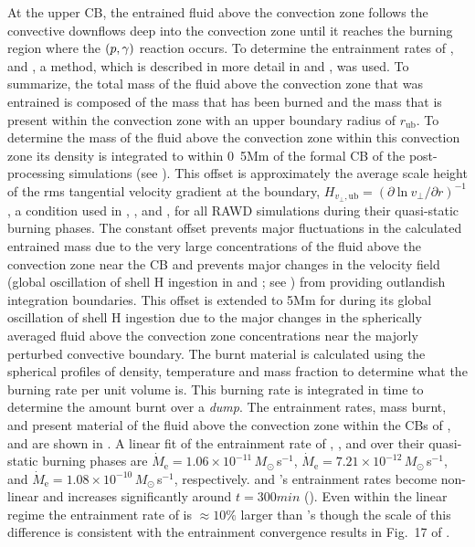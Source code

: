 \documentclass[fleqn,usenatbib]{mnras}
\newcommand{\cldfluid}{fluid above the convection zone}
\begin{document}
At the upper CB, the entrained \cldfluid{} follows the convective
downflows deep into the convection zone until it reaches the burning region
where the $(p,\gamma)$ reaction occurs. To
determine the entrainment rates of ,  and , a
method, which is described in more detail in \citet{Andrassy:19} and
\citet{Denissenkov:19}, was used. To summarize, the total mass of the
\cldfluid{} that was entrained is composed of the mass that has been
burned and the mass that is present within the convection zone with an upper
boundary radius of $r_\mathrm{ub}$. To determine the mass of the \cldfluid{}
within this convection zone its density is integrated to within
\unit{0.5}{Mm} of the formal CB of the \mppnp{} post-processing simulations
(see ). This offset is approximately the average scale
height of the rms tangential velocity gradient at the boundary, $H_{v_{\perp},
\mathrm{ub}} = (\partial \: \mathrm{ln} \: v_{\perp} / \partial r)^{-1}$, a
condition used in \citet{Jones:2017kc}, \citet{Andrassy:19}, and
\citet{Denissenkov:19}, for all RAWD simulations during their quasi-static
burning phases. The constant offset prevents major fluctuations in the
calculated entrained mass due to the very large concentrations of the
\cldfluid{} near the CB and prevents major changes in the velocity field
(global oscillation of shell H ingestion in  and ; see ) from providing
outlandish integration boundaries. This offset is extended to \unit{5}{Mm} for
 during its global oscillation of shell H ingestion due to the major changes in the spherically averaged
\cldfluid{} concentrations near the majorly perturbed convective boundary. The
burnt material is calculated using the spherical profiles of density,
temperature and mass fraction to determine what the burning rate per unit volume
is. This burning rate is integrated in time to determine the amount burnt over a
\textit{dump}. The entrainment rates, mass burnt, and present material of the
\cldfluid{} within the CBs of ,  and  are
shown in . A linear fit of the entrainment rate of ,
, and  over their quasi-static burning phases are
$\dot{M}_{\mathrm{e}} = 1.06 \times 10^{-11}\,M_{\odot}$\,s$^{-1}$,
$\dot{M}_{\mathrm{e}} = 7.21 \times 10^{-12}\,M_{\odot}$\,s$^{-1}$, and
$\dot{M}_{\mathrm{e}} = 1.08 \times 10^{-10}\,M_{\odot}$\,s$^{-1}$,
respectively.  and 's entrainment rates become non-linear
and increases significantly around $t = \unit{300}{min}$ ().
Even within the linear regime the entrainment rate of  is $\approx
10\%$ larger than 's though the scale of this difference is consistent
with the entrainment convergence results in Fig.~17 of \citet[][]{woodward15}.
\end{document}
